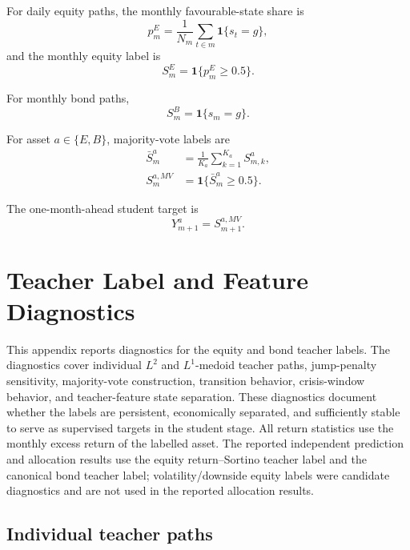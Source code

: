 For daily equity paths, the monthly favourable-state share is
\begin{equation}
p^{E}_m
=
\frac{1}{N_m}
\sum_{t\in m}
\mathbf{1}\{s_t=g\},
\end{equation}
and the monthly equity label is
\begin{equation}
S^{E}_m
=
\mathbf{1}\{p^{E}_m\geq 0.5\}.
\end{equation}

For monthly bond paths,
\begin{equation}
S^{B}_m
=
\mathbf{1}\{s_m=g\}.
\end{equation}

For asset \(a\in\{E,B\}\), majority-vote labels are
\begin{align}
\bar{S}^{a}_m
&=
\frac{1}{K_a}
\sum_{k=1}^{K_a}S^{a}_{m,k}, \\
S^{a,MV}_m
&=
\mathbf{1}\{\bar{S}^{a}_m\geq 0.5\}.
\end{align}

The one-month-ahead student target is
\begin{equation}
Y^a_{m+1}
=
S^{a,MV}_{m+1}.
\end{equation}

\section{Teacher Label and Feature Diagnostics}
\label{app:teacher-label-diagnostics}

This appendix reports diagnostics for the equity and bond teacher labels. The diagnostics
cover individual $L^2$ and $L^1$-medoid teacher paths, jump-penalty sensitivity,
majority-vote construction, transition behavior, crisis-window behavior, and teacher-feature
state separation. These diagnostics document whether the labels are persistent,
economically separated, and sufficiently stable to serve as supervised targets in the
student stage. All return statistics use the monthly excess return of the labelled asset.
The reported independent prediction and allocation results use the equity return--Sortino
teacher label and the canonical bond teacher label; volatility/downside equity labels were
candidate diagnostics and are not used in the reported allocation results.

\subsection{Individual teacher paths}
\label{app:teacher-individual-paths}


